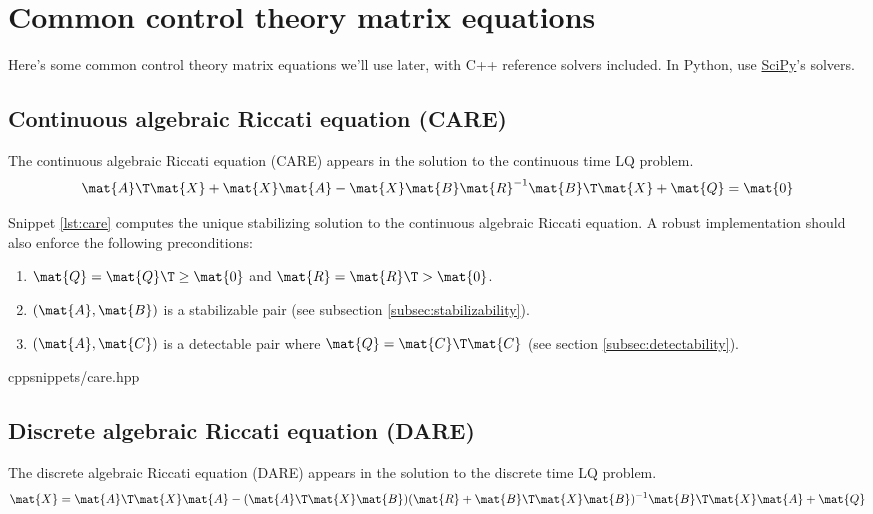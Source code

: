 \section{Common control theory matrix equations}

Here's some common control theory matrix equations we'll use later, with C++
reference solvers included. In Python, use
\href{https://github.com/scipy/scipy}{SciPy}'s solvers.

\subsection{Continuous algebraic Riccati equation (CARE)}

The continuous algebraic Riccati equation (CARE) appears in the solution to the
continuous time LQ problem.
\begin{equation}
  \mat{A}\T\mat{X} + \mat{X}\mat{A} -
    \mat{X}\mat{B}\mat{R}^{-1}\mat{B}\T\mat{X} + \mat{Q} = \mat{0}
\end{equation}

Snippet \ref{lst:care} computes the unique stabilizing solution to the
continuous algebraic Riccati equation. A robust implementation should also
enforce the following preconditions:
\begin{enumerate}
  \item $\mat{Q} = \mat{Q}\T \geq \mat{0}$ and $\mat{R} = \mat{R}\T > \mat{0}$.
  \item $(\mat{A}, \mat{B})$ is a stabilizable pair (see subsection
    \ref{subsec:stabilizability}).
  \item $(\mat{A}, \mat{C})$ is a detectable pair where
    $\mat{Q} = \mat{C}\T\mat{C}$ (see section \ref{subsec:detectability}).
\end{enumerate}
\begin{coderemote}{cpp}{snippets/care.hpp}
  \caption{Continuous algebraic Riccati equation solver in C++}
  \label{lst:care}
\end{coderemote}

\subsection{Discrete algebraic Riccati equation (DARE)}
\label{subsec:dare}

The discrete algebraic Riccati equation (DARE) appears in the solution to the
discrete time LQ problem.
\begin{equation}
  \mat{X} = \mat{A}\T\mat{X}\mat{A} - (\mat{A}\T\mat{X}\mat{B})(\mat{R} +
    \mat{B}\T\mat{X}\mat{B})^{-1} \mat{B}\T\mat{X}\mat{A} + \mat{Q}
\end{equation}

